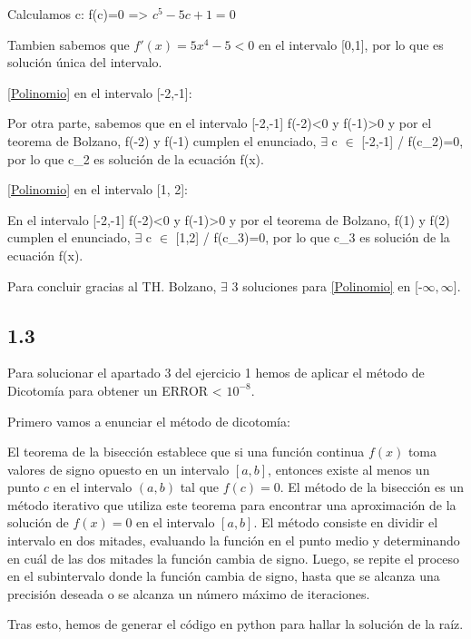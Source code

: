 \documentclass[12pt]{article}
\begin{document}
      Calculamos c:
      f(c)=0 => $c^5-5c+1=0$

      Tambien sabemos que $f'(x)=5x^4-5 <0$ en el intervalo [0,1], por lo que es solución única del intervalo.

      \eqref{Polinomio} en el intervalo [-2,-1]:

      Por otra parte, sabemos que en el intervalo [-2,-1] f(-2)<0 y f(-1)>0 y por el teorema de Bolzano, f(-2) y f(-1) cumplen el enunciado, $\exists$ c $\in$ [-2,-1] / f(c_{2})=0, por lo que c_{2} es solución de la ecuación f(x).

      \eqref{Polinomio} en el intervalo [1, 2]:

      En el intervalo [-2,-1] f(-2)<0 y f(-1)>0 y por el teorema de Bolzano, f(1) y f(2) cumplen el enunciado, $\exists$ c $\in$ [1,2] / f(c_{3})=0, por lo que c_{3} es solución de la ecuación f(x).

      Para concluir gracias al TH. Bolzano, $\exists$ 3 soluciones para \eqref{Polinomio} en [-$\infty, \infty$].

    \subsection{1.3}

      Para solucionar el apartado 3 del ejercicio 1 hemos de aplicar el método de Dicotomía para obtener un ERROR < $10^{-8}$.

      Primero vamos a enunciar el método de dicotomía:

      El teorema de la bisección establece que si una función continua $f(x)$ toma valores de signo opuesto en un intervalo $[a,b]$, entonces existe al menos un punto $c$ en el intervalo $(a,b)$ tal que $f(c) = 0$. El método de la bisección es un método iterativo que utiliza este teorema para encontrar una aproximación de la solución de $f(x) = 0$ en el intervalo $[a,b]$. El método consiste en dividir el intervalo en dos mitades, evaluando la función en el punto medio y determinando en cuál de las dos mitades la función cambia de signo. Luego, se repite el proceso en el subintervalo donde la función cambia de signo, hasta que se alcanza una precisión deseada o se alcanza un número máximo de iteraciones.

      Tras esto, hemos de generar el código en python para hallar la solución de la raíz.
\end{document}
